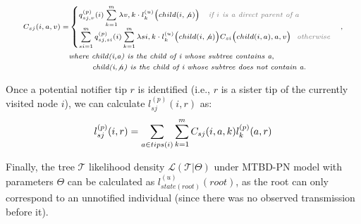 \documentclass[a4paper,10pt]{article}
\begin{document}
\begin{equation}
\scriptsize
\begin{split}
C_{sj}(i,a,v) = &\begin{cases}
q^{(p)}_{sj,v}(i)
\sum\limits_{k=1}^{m}\lambda{v,k} \cdot l_{k}^{(u)}\Big(child(i, \not a)\Big) \textit{\color{gray}~~~if $i$ is a direct parent of $a$}
\\
\sum\limits_{si=1}^{m}q^{(p)}_{sj,si}(i)
\sum\limits_{k=1}^{m}\lambda{si,k} \cdot l_{k}^{(u)}\Big(child(i, \not a)\Big)C_{si}\Big(child(i, a),a,v\Big) \textit{\color{gray}~~otherwise}\\ 
\end{cases},
\\ &\textit{where child(i,a) is the child of i whose subtree contains a},
\\
 &\textit{~~~~~~~~child(i,$\not a$) is the child of i whose subtree does not contain a.}
\end{split}
\label{eq:c}
\end{equation}


Once a potential notifier tip $r$ is identified (i.e., $r$ is a sister tip of the currently visited node $i$), we can calculate $l^{(p)}_{sj}(i, r)$ as:
\begin{equation}
\scriptsize 
l^{(p)}_{sj}(i, r) = \sum\limits_{a \in tips(i)}\sum\limits_{k=1}^{m} C_{sj}(i, a, k) l^{(p)}_{k}(a, r)\label{eq:lp}
\end{equation}


Finally, the tree $\mathscr{T}$ likelihood density $\mathscr{L}(\mathscr{T}|\Theta)$ under MTBD-PN model with parameters $\Theta$ can be calculated as $l^{(u)}_{state(root)}(root)$, as the root can only correspond to an unnotified individual (since there was no observed transmission before it).

\end{document}
